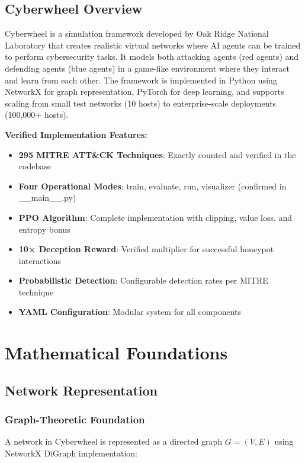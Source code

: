 \documentclass[12pt,a4paper]{article}
\begin{document}
\subsection{Cyberwheel Overview}
Cyberwheel is a simulation framework developed by Oak Ridge National Laboratory that creates realistic virtual networks where AI agents can be trained to perform cybersecurity tasks. It models both attacking agents (red agents) and defending agents (blue agents) in a game-like environment where they interact and learn from each other. The framework is implemented in Python using NetworkX for graph representation, PyTorch for deep learning, and supports scaling from small test networks (10 hosts) to enterprise-scale deployments (100,000+ hosts).

\textbf{Verified Implementation Features:}
\begin{itemize}
    \item \textbf{295 MITRE ATT\&CK Techniques}: Exactly counted and verified in the codebase
    \item \textbf{Four Operational Modes}: train, evaluate, run, visualizer (confirmed in \_\_main\_\_.py)
    \item \textbf{PPO Algorithm}: Complete implementation with clipping, value loss, and entropy bonus
    \item \textbf{10× Deception Reward}: Verified multiplier for successful honeypot interactions
    \item \textbf{Probabilistic Detection}: Configurable detection rates per MITRE technique
    \item \textbf{YAML Configuration}: Modular system for all components
\end{itemize}

\section{Mathematical Foundations}

\subsection{Network Representation}

\subsubsection{Graph-Theoretic Foundation}
A network in Cyberwheel is represented as a directed graph $G = (V, E)$ using NetworkX DiGraph implementation:
\end{document}
